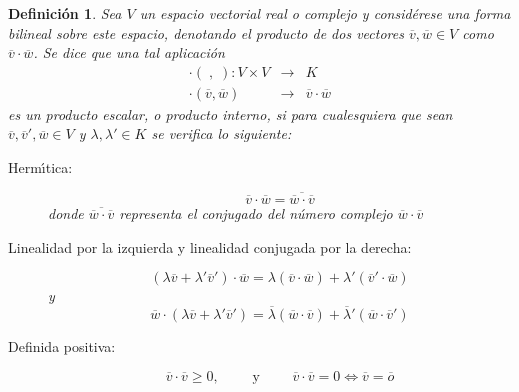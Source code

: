 \documentclass[a4paper,11pt]{article}
\theoremstyle{teoremas}
\theoremstyle{ejemplos}
\theoremstyle{definiciones}
\theoremstyle{lemas}
\newtheorem*{definicion}{Definici\'on}
\begin{document}
\begin{definicion}
 Sea $V$ un espacio vectorial real o complejo y consid\'erese una forma bilineal sobre este espacio, denotando el producto de dos vectores $\overline{v}, \overline{w} \in V$ como $\overline{v}\cdot \overline{w}$. Se dice que una tal aplicaci\'on
 \begin{eqnarray*}
  \cdot(\;,\;) : V\times V & \rightarrow & K \\ 
  \cdot(\overline{v},\overline{w}) & \rightarrow & \overline{v} \cdot \overline{w}
 \end{eqnarray*}
 es un \textit{producto escalar}, o \textit{producto interno}, si para cualesquiera que sean $\overline{v}, \overline{v}', \overline{w} \in V$ y $\lambda, \lambda' \in K$ se verifica lo siguiente:
 \begin{description}
  \item[Herm\'{\i}tica:]
  \begin{equation}
   \overline{v}\cdot \overline{w} = \overline{\overline{w} \cdot \overline{v}}
  \end{equation}
  donde $\overline{\overline{w} \cdot \overline{v}}$ representa el conjugado del n\'umero complejo $\overline{w}\cdot\overline{v}$
  
  \item[Linealidad por la izquierda y linealidad conjugada por la derecha:]
  \begin{equation}
   (\lambda\overline{v} + \lambda'\overline{v}')\cdot \overline{w} = \lambda(\overline{v}\cdot\overline{w}) + \lambda'(\overline{v}'\cdot\overline{w})
  \end{equation}
  y
  \begin{equation}
   \overline{w}\cdot(\lambda\overline{v} + \lambda'\overline{v}') = \overline{\lambda}(\overline{w}\cdot\overline{v}) + \overline{\lambda}'(\overline{w}\cdot\overline{v}')
  \end{equation}
  
  \item[Definida positiva:]
  \begin{equation}
   \overline{v}\cdot \overline{v} \geq 0, \qquad \text{ y } \qquad \overline{v}\cdot \overline{v} = 0 \Leftrightarrow \overline{v} = \overline{o}
  \end{equation}
 \end{description}
\end{definicion}
\end{document}
